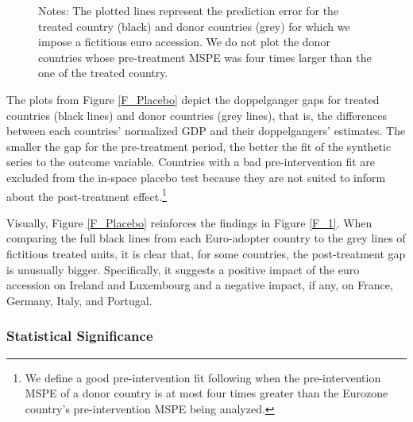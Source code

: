 \documentclass[12pt]{article}
\newcommand{\annote}[1]{\parbox{\textwidth}{\renewcommand{\baselinestretch}{1.0}\vspace{12pt} \small Notes: #1}}
\begin{document}
\begin{figure}[h!]
		 \vspace{-1em}
		\annote{\footnotesize The plotted lines represent the prediction error for the treated country (black) and donor countries (grey) for which we impose a fictitious euro accession. We do not plot the donor countries whose pre-treatment MSPE was four times larger than the one of the treated country.}
\end{figure}

The plots from Figure \ref{F_Placebo} depict the doppelganger gaps for treated countries (black lines) and donor countries (grey lines), that is, the differences between each countries' normalized GDP and their doppelgangers' estimates. The smaller the gap for the pre-treatment period, the better the fit of the synthetic series to the outcome variable. Countries with a bad pre-intervention fit are excluded from the in-space placebo test because they are not suited to inform about the post-treatment effect.\footnote{We define a good pre-intervention fit following \cite{Firpo2018} when the pre-intervention MSPE of a donor country is at most four times greater than the Eurozone country’s pre-intervention MSPE being analyzed.} 

Visually, Figure \ref{F_Placebo} reinforces the findings in Figure \ref{F_1}. When comparing the full black lines from each Euro-adopter country to the grey lines of fictitious treated units, it is clear that,  for some countries, the post-treatment gap is unusually bigger. Specifically, it suggests a positive impact of the euro accession on Ireland and Luxembourg and a negative impact, if any, on France, Germany, Italy, and Portugal.


\subsubsection{Statistical Significance \label{SS_stat}}
\end{document}
